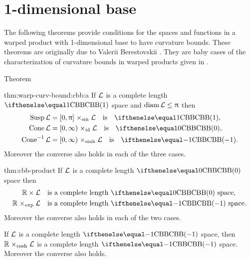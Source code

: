 \section{1-dimensional base}

The following theorems  provide conditions for the spaces and functions in a warped product with 1-dimensional base to have curvature bounds.
These theorems are originally due to Valerii Berestovskii \cite{berestovskii}.
They are baby cases of the characterization of curvature bounds in warped products given in \cite{alexander-bishop:warps,alexander-bishop:warp1}.

\begin{thm}{Theorem}\label{thm:warp-curv-bound:cbb}
\begin{subthm}{thm:warp-curv-bound:cbb:a}
If $\mathcal{L}$ is a complete length $\Alex{1}$ space and $\diam\spc{L}\le\pi$
then 
\begin{align*}
\Susp\spc{L}&=[0,\pi]\warp{\sin}\spc{L}\quad\text{is}\quad  \Alex1,
\\
\Cone\spc{L}&=[0,\infty)\warp{\id}\spc{L}\quad\text{is}\quad  \Alex0,
\\
\Cone\mc{-1}\spc{L}&=[0,\infty)\warp{\sinh}\spc{L}\quad\text{is}\quad \Alex{-1}.
\end{align*}
Moreover the converse also holds in each of the three cases.
\end{subthm}

\begin{subthm}{thm:cbb-product}
If $\mathcal{L}$ is a complete length $\Alex0$ space
then 
\begin{align*}
\RR\times\spc{L}&\quad\text{is a complete length $\Alex0$ space},
\\
\RR\warp{\exp}\spc{L}&\quad\text{is a complete length $\Alex{-1}$ space.}
\end{align*}
Moreover the converse also holds in each of the two cases.
\end{subthm}

\begin{subthm}{}
If $\mathcal{L}$ is a complete length $\Alex{-1}$ space,
then $\RR\warp{\cosh}\spc{L}$ is a complete length $\Alex{-1}$ space.
Moreover the converse also holds.
\end{subthm}
\end{thm}


